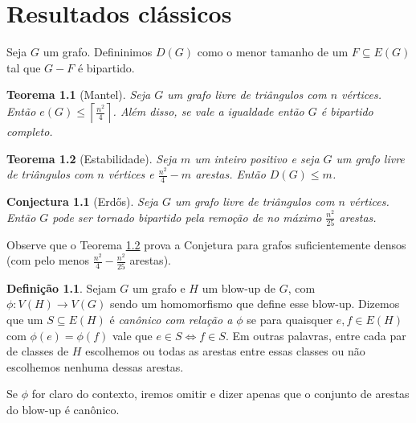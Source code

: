 \chapter{Resultados clássicos}
\label{cap:classicos}

\theoremstyle{plain}
\newtheorem{theorem}{Teorema}

\theoremstyle{plain}
\newtheorem{conjecture}{Conjectura}

\theoremstyle{plain}
\newtheorem{claim}{Afirmação}

\theoremstyle{plain}
\newtheorem{corollary}{Corolário}

\theoremstyle{definition}
\newtheorem{definition}{Definição}

Seja $G$ um grafo. Defininimos $D(G)$ como o menor tamanho de um $F \subseteq E(G)$ tal que $G-F$ é bipartido.

\begin{theorem}[Mantel]
  Seja $G$ um grafo livre de triângulos com $n$ vértices.
  Então $e(G) \leq \left\lceil\frac{n^2}{4}\right\rceil$.
  Além disso, se vale a igualdade então $G$ é bipartido completo.
\end{theorem}

\begin{theorem}[Estabilidade] \label{thm:estabilidade}
  Seja $m$ um inteiro positivo e seja $G$ um grafo livre de triângulos com $n$ vértices e $\frac{n^2}{4}-m$ arestas.
  Então $D(G) \leq m$.
\end{theorem}

\begin{conjecture}[Erd\H os] \label{conj:make-bipartite}
  Seja $G$ um grafo livre de triângulos com $n$ vértices.
  Então $G$ pode ser tornado bipartido pela remoção de no máximo $\frac{n^2}{25}$ arestas.
\end{conjecture}

Observe que o Teorema \ref{thm:estabilidade} prova a Conjetura para grafos suficientemente densos (com pelo menos $\frac{n^2}{4} - \frac{n^2}{25}$ arestas).

\begin{definition}
  Sejam $G$ um grafo e $H$ um blow-up de $G$, com $\phi \colon V(H) \to V(G)$ sendo um homomorfismo que define esse blow-up.
  Dizemos que um $S \subseteq E(H)$ é \textit{canônico com relação a $\phi$} se para quaisquer $e,f \in E(H)$ com
  $\phi(e)=\phi(f)$ vale que $e \in S \iff f \in S$.
  Em outras palavras, entre cada par de classes de $H$ escolhemos ou todas as arestas entre essas classes ou não escolhemos nenhuma dessas arestas.
  
  Se $\phi$ for claro do contexto, iremos omitir e dizer apenas que o conjunto de arestas do blow-up é canônico.
\end{definition}

